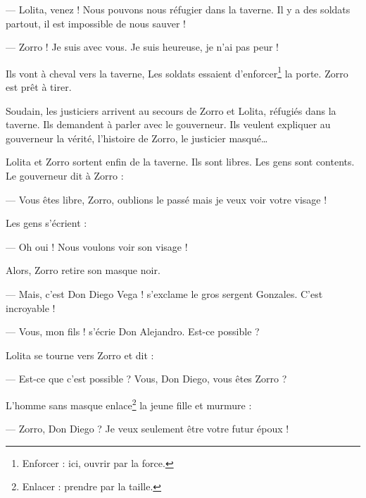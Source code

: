--- Lolita, venez ! Nous pouvons nous réfugier dans la taverne. Il y a des soldats partout, il est impossible de nous sauver !

--- Zorro ! Je suis avec vous. Je suis heureuse, je n'ai pas peur !

Ils vont à cheval vers la taverne, Les soldats essaient d'enforcer\footnote{Enforcer : ici, ouvrir par la force.} la porte. Zorro
est prêt à tirer.

Soudain, les justiciers arrivent au secours de Zorro et Lolita, réfugiés dans la taverne. Ils demandent à parler avec le
gouverneur. Ils veulent expliquer au gouverneur la vérité, l'histoire de Zorro, le justicier masqué\ldots{}

Lolita et Zorro sortent enfin de la taverne. Ils sont libres. Les gens sont contents. Le gouverneur dit à Zorro :

--- Vous êtes libre, Zorro, oublions le passé mais je veux voir votre visage !

Les gens s'écrient :

--- Oh oui ! Nous voulons voir son visage !

Alors, Zorro retire son masque noir.

--- Mais, c'est Don Diego Vega ! s'exclame le gros sergent Gonzales. C'est incroyable !

--- Vous, mon fils ! s'écrie Don Alejandro. Est-ce possible ?

Lolita se tourne vers Zorro et dit :

--- Est-ce que c'est possible ? Vous, Don Diego, vous êtes Zorro ?

L'homme sans masque enlace\footnote{Enlacer : prendre par la taille.} la jeune fille et murmure :

--- Zorro, Don Diego ? Je veux seulement être votre futur époux !
